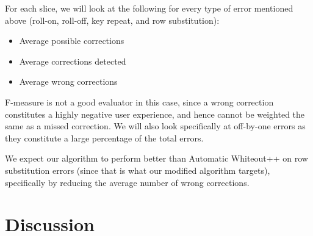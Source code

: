 \documentclass[letterpaper, 9 pt, conference]{ieeeconf}  %
\begin{document}
For each slice, we will look at the following for every type of error mentioned above (roll-on, roll-off, key repeat, and row substitution):
\begin{itemize}
\item Average possible corrections
\item Average corrections detected
\item Average wrong corrections
\end{itemize}

F-measure is not a good evaluator in this case, since a wrong correction constitutes a highly negative user experience, and hence cannot be weighted the same as a missed correction.  
We will also look specifically at off-by-one errors as they constitute a large percentage of the total errors.

We expect our algorithm to perform better than Automatic Whiteout++ on row substitution errors (since that is what our modified algorithm targets), specifically by reducing the average number of wrong corrections.

\section{Discussion}




\end{document}

